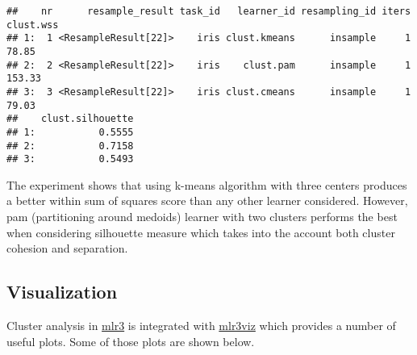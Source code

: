 \documentclass[
]{scrbook}
\newenvironment{Shaded}{\begin{snugshade}}{\end{snugshade}}
\newcommand{\AttributeTok}[1]{\textcolor[rgb]{0.77,0.63,0.00}{#1}}
\newcommand{\CommentTok}[1]{\textcolor[rgb]{0.56,0.35,0.01}{\textit{#1}}}
\newcommand{\DecValTok}[1]{\textcolor[rgb]{0.00,0.00,0.81}{#1}}
\newcommand{\FunctionTok}[1]{\textcolor[rgb]{0.00,0.00,0.00}{#1}}
\newcommand{\NormalTok}[1]{#1}
\newcommand{\OtherTok}[1]{\textcolor[rgb]{0.56,0.35,0.01}{#1}}
\newcommand{\SpecialCharTok}[1]{\textcolor[rgb]{0.00,0.00,0.00}{#1}}
\newcommand{\StringTok}[1]{\textcolor[rgb]{0.31,0.60,0.02}{#1}}
\renewenvironment{Shaded} {\begin{snugshade}\small} {\end{snugshade}}
\begin{document}
\begin{Shaded}
\end{Shaded}

\begin{verbatim}
##    nr      resample_result task_id   learner_id resampling_id iters clust.wss
## 1:  1 <ResampleResult[22]>    iris clust.kmeans      insample     1     78.85
## 2:  2 <ResampleResult[22]>    iris    clust.pam      insample     1    153.33
## 3:  3 <ResampleResult[22]>    iris clust.cmeans      insample     1     79.03
##    clust.silhouette
## 1:           0.5555
## 2:           0.7158
## 3:           0.5493
\end{verbatim}

The experiment shows that using k-means algorithm with three centers produces a better within sum of squares score than any other learner considered. However, pam (partitioning around medoids) learner with two clusters performs the best when considering silhouette measure which takes into the account both cluster cohesion and separation.

\hypertarget{visualization}{%
\subsection{Visualization}\label{visualization}}

Cluster analysis in \href{https://mlr3.mlr-org.com}{mlr3} is integrated with \href{https://mlr3viz.mlr-org.com}{mlr3viz} which provides a number of useful plots. Some of those plots are shown below.

\begin{Shaded}
\end{Shaded}
\end{document}
